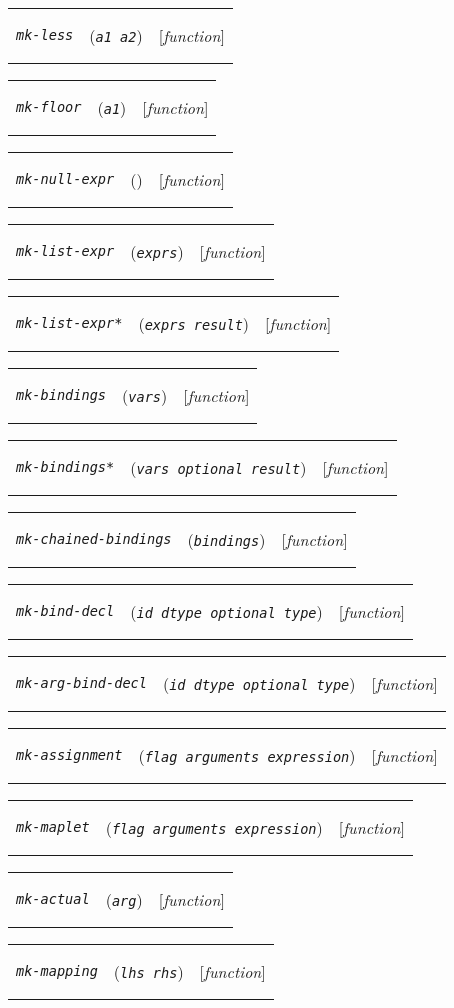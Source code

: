 \documentclass[12pt]{book}
\makeatletter
\def\ampoptional{{\smaller\sc {\smaller\smaller \&}optional\ }}
\newenvironment{function}[3]%
{\par\noindent\begin{boxedminipage}{\textwidth}%
 \par\noindent\begin{tabularx}{\linewidth}{l>{\raggedright}Xr}%
 \functionhtgt{#1}&(\texttt{\textit{#2}})&[\emph{#3}]%
 \end{tabularx}\par\flushright\begin{minipage}{.97\textwidth}}
{\end{minipage}\end{boxedminipage}}
\newcommand{\functionnm}[1]{\texttt{\textit{#1}}}
\newcommand{\functionhtgt}[1]{\hypertarget{#1}{\functionnm{#1}}\index{#1@\functionnm{#1}|underline}}
\newenvironment{lispfunction}[2]%
{\begin{function}{#1}{#2}{function}}{\end{function}}
\makeatother
\begin{document}
\begin{lispfunction}{mk-less}{a1 a2}
\end{lispfunction}

\begin{lispfunction}{mk-floor}{a1}
\end{lispfunction}

\begin{lispfunction}{mk-null-expr}{}
\end{lispfunction}

\begin{lispfunction}{mk-list-expr}{exprs}
\end{lispfunction}

\begin{lispfunction}{mk-list-expr*}{exprs result}
\end{lispfunction}

\begin{lispfunction}{mk-bindings}{vars}
\end{lispfunction}

\begin{lispfunction}{mk-bindings*}{vars \ampoptional result}
\end{lispfunction}

\begin{lispfunction}{mk-chained-bindings}{bindings}
\end{lispfunction}

\begin{lispfunction}{mk-bind-decl}{id dtype \ampoptional type}
\end{lispfunction}

\begin{lispfunction}{mk-arg-bind-decl}{id dtype \ampoptional type}
\end{lispfunction}

\begin{lispfunction}{mk-assignment}{flag arguments expression}
\end{lispfunction}

\begin{lispfunction}{mk-maplet}{flag arguments expression}
\end{lispfunction}

\begin{lispfunction}{mk-actual}{arg}
\end{lispfunction}

\begin{lispfunction}{mk-mapping}{lhs rhs}
\end{lispfunction}
\end{document}
